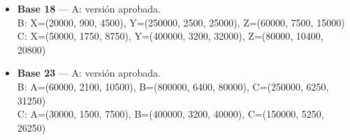 \documentclass[10pt,letterpaper]{article}
\begin{document}
\begin{itemize}[leftmargin=1.2em,itemsep=1pt,topsep=1pt]
\item \textbf{Base 18} --- A: versión aprobada.
\\ \hspace{1em}B: X=(20000, 900, 4500), Y=(250000, 2500, 25000), Z=(60000, 7500, 15000)
\\ \hspace{1em}C: X=(50000, 1750, 8750), Y=(400000, 3200, 32000), Z=(80000, 10400, 20800)
\item \textbf{Base 23} --- A: versión aprobada.
\\ \hspace{1em}B: A=(60000, 2100, 10500), B=(800000, 6400, 80000), C=(250000, 6250, 31250)
\\ \hspace{1em}C: A=(30000, 1500, 7500), B=(400000, 3200, 40000), C=(150000, 5250, 26250)
\end{itemize}
\end{document}
